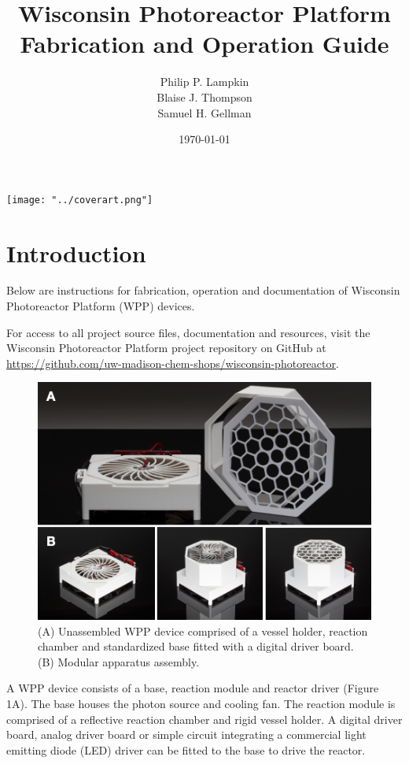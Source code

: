 \documentclass[11pt]{article}
\title{Wisconsin Photoreactor Platform\\Fabrication and Operation Guide}
\author{
  Philip P. Lampkin \\
  Blaise J. Thompson \\
  Samuel H. Gellman
  }
\date{\today}
\let\stdsection\section
\renewcommand\section{\clearpage\stdsection}
\begin{document}
\maketitle

\texttt{[image: "../coverart.png"]}

\tableofcontents

\section{Introduction}

Below are instructions for fabrication, operation and documentation of Wisconsin Photoreactor Platform (WPP) devices. 

For access to all project source files, documentation and resources, visit the Wisconsin Photoreactor Platform project repository on GitHub at \href{https://github.com/uw-madison-chem-shops/wisconsin-photoreactor}{https://github.com/uw-madison-chem-shops/wisconsin-photoreactor}. 

\begin{figure}[H]
	\includegraphics[width=\textwidth]{"./fig1.png"}
	\caption{(A) Unassembled WPP device comprised of a vessel holder, reaction chamber and standardized base fitted with a digital driver board. (B) Modular apparatus assembly.}
\end{figure}
A WPP device consists of a base, reaction module and reactor driver (Figure 1A).
The base houses the photon source and cooling fan.
The reaction module is comprised of a reflective reaction chamber and rigid vessel holder.
A digital driver board, analog driver board or simple circuit integrating a commercial light emitting diode (LED) driver can be fitted to the base to drive the reactor.
\end{document}

